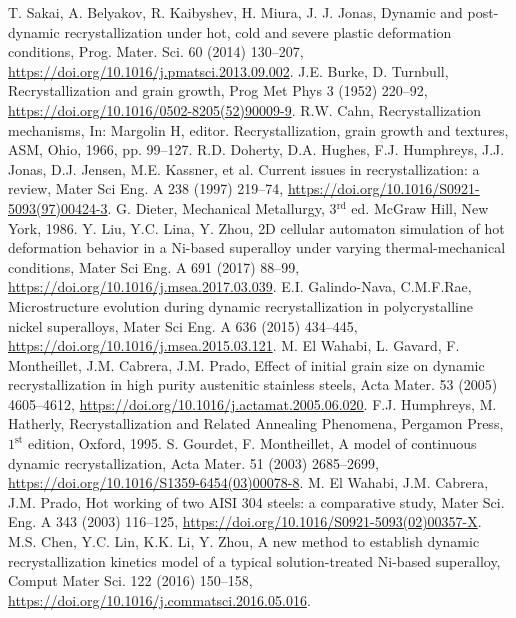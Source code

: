 \documentclass[a4paper, 11pt, dvipsnames]{article}
\begin{document}
\begin{thebibliography}{99}
 T. Sakai, A. Belyakov, R. Kaibyshev, H. Miura, J. J. Jonas, Dynamic and post-dynamic recrystallization under hot, cold and severe plastic deformation conditions, Prog. Mater. Sci. 60 (2014) 130--207, \url{https://doi.org/10.1016/j.pmatsci.2013.09.002}.
 J.E. Burke, D. Turnbull, {Recrystallization and grain growth}, Prog Met Phys 3 (1952) 220--92, \url{https://doi.org/10.1016/0502-8205(52)90009-9}.
 R.W. Cahn, Recrystallization mechanisms, In: Margolin H, editor. {Recrystallization, grain growth and textures}, ASM, Ohio,
1966, pp. 99--127.
 R.D. Doherty, D.A. Hughes, F.J. Humphreys, J.J. Jonas, D.J. Jensen, M.E. Kassner, et al. {Current issues in recrystallization: a review}, Mater Sci Eng. A 238 (1997) 219--74, \url{https://doi.org/10.1016/S0921-5093(97)00424-3}.
  G. Dieter, Mechanical Metallurgy, 3$^{\text{rd}}$ ed. McGraw Hill, New York, 1986.
 Y. Liu, Y.C. Lina, Y. Zhou, {2D cellular automaton simulation of hot deformation behavior in a Ni-based superalloy under varying thermal-mechanical conditions},  Mater Sci Eng. A 691 (2017) 88--99, \url{https://doi.org/10.1016/j.msea.2017.03.039}.
 E.I. Galindo-Nava, C.M.F.Rae, {Microstructure evolution during dynamic recrystallization in polycrystalline nickel superalloys}, Mater Sci Eng. A 636 (2015) 434--445, \url{https://doi.org/10.1016/j.msea.2015.03.121}.
 M. El Wahabi, L. Gavard, F. Montheillet, J.M. Cabrera, J.M. Prado, {Effect of initial grain size on dynamic recrystallization in high purity austenitic stainless steels}, Acta Mater. 53 (2005) 4605--4612, \url{https://doi.org/10.1016/j.actamat.2005.06.020}.
 F.J. Humphreys, M. Hatherly, {Recrystallization and Related Annealing Phenomena}, Pergamon Press, $1^\text{st}$ edition, Oxford, 1995. 
 S. Gourdet, F. Montheillet, {A model of continuous dynamic recrystallization}, Acta Mater. 51 (2003) 2685--2699, \url{https://doi.org/10.1016/S1359-6454(03)00078-8}.
 M. El Wahabi, J.M. Cabrera, J.M. Prado, Hot working of two AISI 304 steels: a comparative study, Mater Sci. Eng. A 343 (2003) 116--125, \url{https://doi.org/10.1016/S0921-5093(02)00357-X}.
 M.S. Chen, Y.C. Lin, K.K. Li, Y. Zhou, A new method to establish dynamic recrystallization kinetics model of a typical solution-treated Ni-based superalloy, Comput Mater Sci. 122 (2016) 150--158, \url{https://doi.org/10.1016/j.commatsci.2016.05.016}.

\end{thebibliography}
\end{document}
